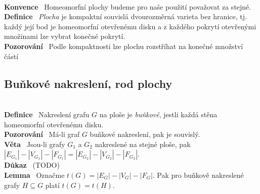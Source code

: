 \documentclass{article}
\renewcommand{\paragraph}[1]{\ \\\smallskip\noindent\textbf{#1}\ }
\begin{document}
\paragraph{Konvence} Homeomorfní plochy budeme pro naše použití považovat za 
stejné.
\paragraph{Definice} \textit{Plocha} je kompaktní souvislá dvourozměrná varieta 
bez hranice, tj. každý její bod je homeomorfní otevřenému disku a z každého 
pokrytí otevřenými množinami lze vybrat konečné pokrytí.
\paragraph{Pozorování} Podle kompaktnosti lze plochu rozstříhat na konečné 
množství částí
\subsection{Buňkové nakreslení, rod plochy}
\paragraph{Definice} Nakreslení grafu $G$ na ploše je \textit{buňkové}, jestli 
každá stěna homeomorfní otevřenému disku.
\paragraph{Pozorování} Má-li graf $G$ buňkové nakreslení, pak je souvislý.
\paragraph{Věta} Jsou-li grafy $G_1$ a $G_2$ nakreslené na stejné ploše, pak 
$|E_{G_1}| - |V_{G_1}| - |F_{G_1}| = |E_{G_2}| - |V_{G_2}| - |F_{G_2}|$.
\paragraph{Důkaz} (TODO)
\paragraph{Lemma} Označme $t(G) = |E_G| - |V_G| - |F_G|$. Pak pro buňkově 
nakreslené grafy $H \subseteq G$ platí $t(G) = t(H)$.
\end{document}
